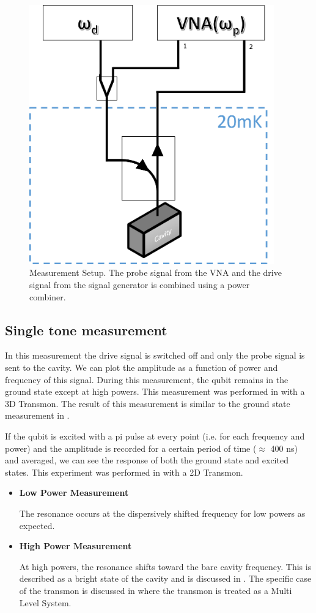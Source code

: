 \begin{figure}
\centering
\includegraphics[width=400px]{Figures/measurement_circuit.png}
\decoRule
\caption[Measurement Setup]{Measurement Setup. The probe signal from the VNA and the drive signal from the signal generator is combined using a power combiner.}
\label{fig:measurement setup}
\end{figure}

\subsection{Single tone measurement}

In this measurement the drive signal is switched off and only the probe signal is sent to the cavity. We can plot the amplitude as a function of power and frequency of this signal. During this measurement, the qubit remains in the ground state except at high powers. This measurement was performed in \cite{Paik2011} with a 3D Transmon. The result of this measurement is similar to the ground state measurement in \cite{Reed2010}.

If the qubit is excited with a pi pulse at every point (i.e. for each frequency and power) and the amplitude is recorded for a certain period of time ($\approx$ 400 ns) and averaged, we can see the response of both the ground state and excited states. This experiment was performed in \cite{Reed2010} with a 2D Transmon.

\begin{itemize}
\item \textbf{Low Power Measurement}

The resonance occurs at the dispersively shifted frequency for low powers as expected.

\item \textbf{High Power Measurement}

At high powers, the resonance shifts toward the bare cavity frequency. This is described as a bright state of the cavity and is discussed in \cite{Bishop2010}. The specific case of the transmon is discussed in \cite{Boissonneault2010} where the transmon is treated as a Multi Level System.
\end{itemize}


